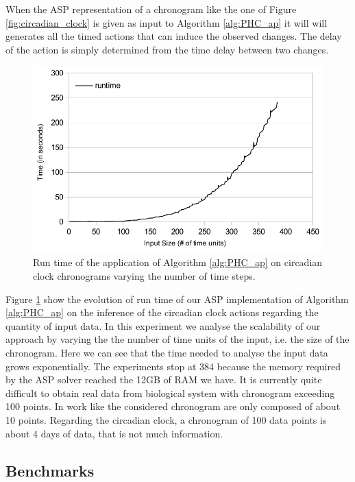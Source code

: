 When the ASP representation of a chronogram like the one of Figure \ref{fig:circadian_clock} is given as input to Algorithm \ref{alg:PHC_ap} it will will generates all the timed actions that can induce the observed changes.
The delay of the action is simply determined from the time delay between two changes.

\begin{figure}[htb!]
\begin{center}
\includegraphics[width=0.6\linewidth]{images/circadian_run_time}
\end{center}
\caption{Run time of the application of Algorithm \ref{alg:PHC_ap} on circadian clock chronograms varying the number of time steps.}
\label{fig:run_time}
\end{figure}

Figure \ref{fig:run_time} show the evolution of run time of our ASP implementation of Algorithm \ref{alg:PHC_ap} on the inference of the circadian clock actions regarding the quantity of input data.
In this experiment we analyse the scalability of our approach by varying the the number of time units of the input, i.e. the size of the chronogram.
Here we can see that the time needed to analyse the input data grows exponentially.
The experiments stop at 384 because the memory required by the ASP solver reached the 12GB of RAM we have.
It is currently quite difficult to obtain real data from biological system with chronogram exceeding 100 points.
In work like \cite{Fippo14} the considered chronogram are only composed of about 10 points.
Regarding the circadian clock, a chronogram of 100 data points is about 4 days of data, that is not much information.

\subsection{Benchmarks}
